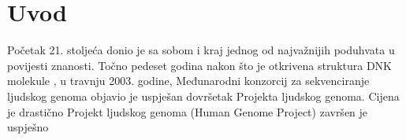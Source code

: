 \section{Uvod}
\label{ch:intro}

Početak 21. stoljeća donio je sa sobom i kraj jednog od najvažnijih poduhvata u povijesti znanosti. Točno pedeset godina nakon što je otkrivena struktura DNK molekule \cite{Watson01}, u travnju 2003. godine, Međunarodni konzorcij za sekvenciranje ljudskog genoma objavio je uspješan dovršetak Projekta ljudskog genoma. Cijena je drastično 
Projekt ljudskog genoma (Human Genome Project)  završen je uspješno

